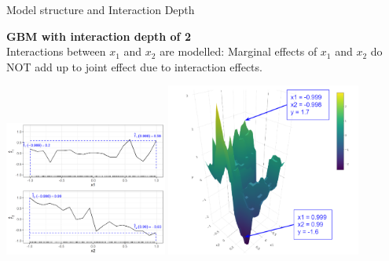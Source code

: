 \begin{vbframe}{Model structure and Interaction Depth}

%

\framebreak

\textbf{GBM with interaction depth of 2}\\
Interactions between $x_1$ and $x_2$ are modelled: Marginal effects of $x_1$ and $x_2$ do NOT add up to joint effect due to interaction effects.

\begin{center}
\includegraphics[width=0.4\textwidth]{figure_man/boosting_interaction_example_ID2.PNG}
\includegraphics[width=0.48\textwidth]{figure/interaction_td2_d3.png}
\end{center}


\end{vbframe}
